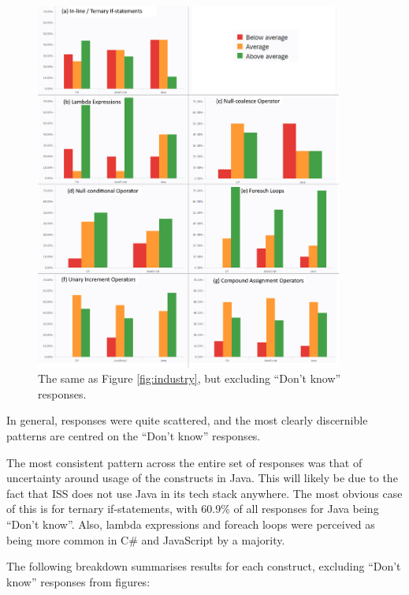 \documentclass{article}
\begin{document}
            \begin{figure}[htbp]
                \centering
                \includegraphics[width=0.9\textwidth]{industryExcl}
                \caption{The same as Figure \ref{fig:industry}, but excluding ``Don't know'' responses.}
                \label{fig:industryExcl}
            \end{figure}

            In general, responses were quite scattered, and the most clearly discernible patterns are centred on the ``Don't know'' responses.

            The most consistent pattern across the entire set of responses was that of uncertainty around usage of the constructs in Java. This will likely be due to the fact that ISS does not use Java in its tech stack anywhere. The most obvious case of this is for ternary if-statements, with 60.9\% of all responses for Java being ``Don't know''. Also, lambda expressions and foreach loops were perceived as being more common in C\# and JavaScript by a majority.

            The following breakdown summarises results for each construct, excluding ``Don't know'' responses from figures:
            
\end{document}
